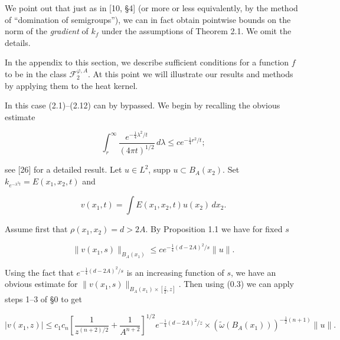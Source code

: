 \begin{remark}
\label{rem:gradient-kernel-estimate}

We point out that just as in [10, \S 4] (or more or less equivalently, by the method of ``domination of semigroups''), we can in fact obtain pointwise bounds on the norm of the \textit{gradient} of $k_f$ under the assumptions of Theorem 2.1. We omit the details.
\end{remark}

In the appendix to this section, we describe sufficient conditions for a function $f$ to be in the class $\mathcal{F}^{\varphi,A}_2$. At this point we will illustrate our results and methods by applying them to the heat kernel.

\begin{example}
\label{ex:heat-kernel}

In this case (2.1)--(2.12) can by bypassed. We begin by recalling the obvious estimate

\begin{equation}\tag{2.17}
\int_r^\infty \frac{e^{-\frac14 \lambda^2/t}}{(4\pi t)^{1/2}}\, d\lambda \le ce^{-\frac14 r^2/t};
\end{equation}

see [26] for a detailed result. Let $u \in L^2$, supp $u \subset B_A(x_2)$. Set $k_{e^{-\lambda^2 t}} = E(x_1,x_2,t)$ and

\begin{equation}\tag{2.18}
v(x_1,t)=\int E(x_1,x_2,t)u(x_2)\, dx_2.
\end{equation}

Assume first that $\rho(x_1,x_2)=d>2A$. By Proposition 1.1 we have for fixed $s$

\begin{equation}\tag{2.19}
\|v(x_1,s)\|_{B_A(x_1)} \le ce^{-\frac14(d-2A)^2/s}\|u\|.
\end{equation}

Using the fact that $e^{-\frac14(d-2A)^2/s}$ is an increasing function of $s$, we have an obvious estimate for $\|v(x_1,s)\|_{B_A(x_1)\times[\frac{z}{2},z]}$. Then using (0.3) we can apply steps 1--3 of \S0 to get

\begin{equation}\tag{2.20}
|v(x_1,z)| \le c_1 c_n \left[\frac{1}{z^{(n+2)/2}} + \frac{1}{A^{n+2}}\right]^{1/2} e^{-\frac14(d-2A)^2/z}
\times \left(\widetilde{\omega}(B_A(x_1))\right)^{-\frac12(n+1)}\|u\|.
\end{equation}


\end{example}
